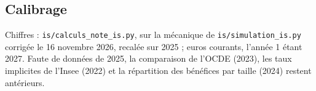 
\subsection{Calibrage}\label{ann:is_calibrage}

Chiffres : \texttt{is/calculs\_note\_is.py}, sur la mécanique de \texttt{is/simulation\_is.py} corrigée le 16 novembre
2026, recalée sur 2025 ; euros courants, l'année 1 étant 2027. Faute de données de 2025, la comparaison de l'OCDE
(2023), les taux implicites de l'Insee (2022) et la répartition des bénéfices par taille (2024) restent antérieurs.

